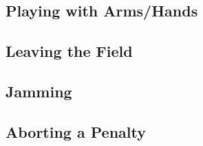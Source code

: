 \subsection{Playing with Arms/Hands}
\label{sec:playing_with_hands}

\subsection{Leaving the Field}
\label{sec:leaving_the_field}

\subsection{Jamming}
\label{sec:jamming}

\subsection{Aborting a Penalty}
\label{sec:aborting_penalty}

